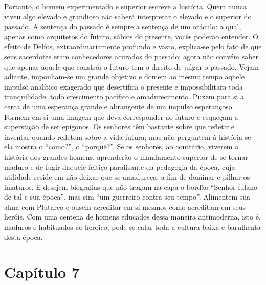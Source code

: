 Portanto, o homem experimentado e superior escreve a história. Quem
nunca viveu algo elevado e grandioso não saberá interpretar o elevado e
o superior do passado. A sentença do passado é sempre a sentença de um
oráculo: a qual, apenas como arquitetos do futuro, sábios do presente,
vocês poderão entender. O efeito de Delfos, extraordinariamente profundo
e vasto, explica-se pelo fato de que seus sacerdotes eram conhecedores
acurados do passado; agora não convém saber que apenas aquele que
constrói o futuro tem o direito de julgar o passado. Vejam adiante,
imponham-se um grande objetivo e domem ao mesmo tempo aquele impulso
analítico exagerado que desertifica o presente e impossibilitara toda
tranquilidade, todo crescimento pacífico e amadurecimento. Puxem para si
a cerca de uma esperança grande e abrangente de um impulso esperançoso.
Formem em si uma imagem que deva corresponder ao futuro e esqueçam a
superstição de ser epígonos. Os senhores têm bastante sobre que refletir
e inventar quando refletem sobre a vida futura; mas não perguntem à
história se ela mostra o ``como?'', o ``porquê?''. Se os senhores, ao
contrário, viverem a história dos grandes homens, aprenderão o
mandamento superior de se tornar maduro e de fugir daquele feitiço
paralisante da pedagogia da época, cuja utilidade reside em não deixar
que se amadureça, a fim de dominar e pilhar os imaturos. E desejem
biografias que não tragam na capa o bordão ``Senhor fulano de tal e sua
época'', mas sim ``um guerreiro contra seu tempo''. Alimentem sua alma
com Plutarco e ousem acreditar em si mesmos como acreditam em seus
heróis. Com uma centena de homens educados dessa maneira antimoderna,
isto é, maduros e habituados ao heroico, pode-se calar toda a cultura
baixa e barulhenta desta época.

\chapter{Capítulo 7}\label{capuxedtulo-7}

